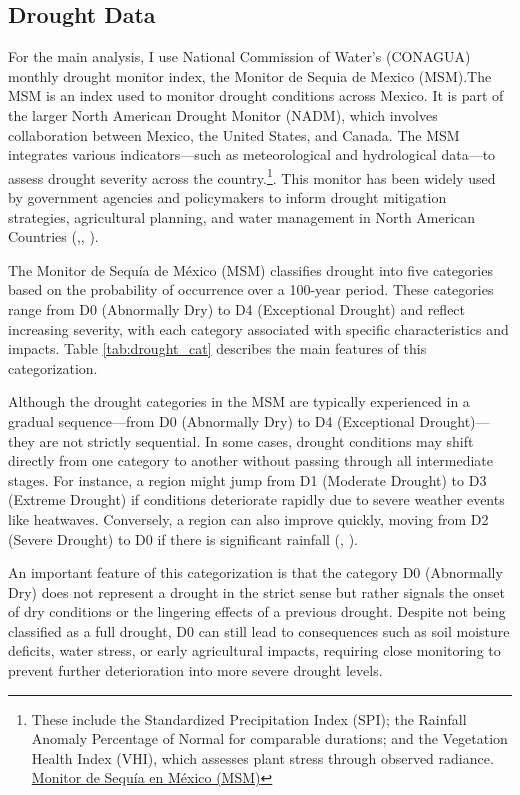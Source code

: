 \documentclass[12pt, oneside]{article}      %
\begin{document}
\subsection{Drought Data}

For the main analysis, I use National Commission of Water's (CONAGUA) monthly drought monitor index, the Monitor de Sequia de Mexico (MSM).The MSM is an index used to monitor drought conditions across Mexico. It is part of the larger North American Drought Monitor (NADM), which involves collaboration between Mexico, the United States, and Canada. The MSM integrates various indicators—such as meteorological and hydrological data—to assess drought severity across the country.\footnote{These include the Standardized Precipitation Index (SPI); the Rainfall Anomaly Percentage of Normal for comparable durations; and the Vegetation Health Index (VHI), which assesses plant stress through observed radiance. \href{https://smn.conagua.gob.mx/es/climatologia/monitor-de-sequia/monitor-de-sequia-en-mexico}{Monitor de Sequía en México (MSM)}}.  This monitor has been widely used by government agencies and policymakers to inform drought mitigation strategies, agricultural planning, and water management in North American Countries (\cite{Mardian2022},\cite{lobato2016drought}, \cite{usdrought2002}).

The Monitor de Sequía de México (MSM) classifies drought into five categories based on the probability of occurrence over a 100-year period. These categories range from D0 (Abnormally Dry) to D4 (Exceptional Drought) and reflect increasing severity, with each category associated with specific characteristics and impacts. Table \ref{tab:drought_cat} describes the main features of this categorization.



Although the drought categories in the MSM are typically experienced in a gradual sequence—from D0 (Abnormally Dry) to D4 (Exceptional Drought)—they are not strictly sequential. In some cases, drought conditions may shift directly from one category to another without passing through all intermediate stages. For instance, a region might jump from D1 (Moderate Drought) to D3 (Extreme Drought) if conditions deteriorate rapidly due to severe weather events like heatwaves. Conversely, a region can also improve quickly, moving from D2 (Severe Drought) to D0 if there is significant rainfall (\cite{lobato2016drought}, \cite{usdrought2002}). 

An important feature of this categorization is that the category D0 (Abnormally Dry) does not represent a drought in the strict sense but rather signals the onset of dry conditions or the lingering effects of a previous drought. Despite not being classified as a full drought, D0 can still lead to consequences such as soil moisture deficits, water stress, or early agricultural impacts, requiring close monitoring to prevent further deterioration into more severe drought levels.
\end{document}
